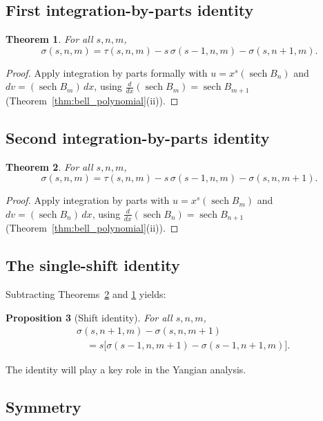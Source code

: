 \documentclass[article]{article}
\theoremstyle{plain}
\newtheorem{theorem}{Theorem}[section]
\newtheorem{proposition}[theorem]{Proposition}
\theoremstyle{definition}
\DeclareMathOperator{\sech}{sech}
\begin{document}
\subsection{First integration-by-parts identity}

\begin{theorem}\label{thm:ibp1}
For all $s,n,m$,
\[
\sigma(s,n,m)
=\tau(s,n,m)-s\,\sigma(s-1,n,m)-\sigma(s,n+1,m).
\]
\end{theorem}

\begin{proof}
Apply integration by parts formally with
$u=x^{s}(\sech B_{n})$ and $dv=(\sech B_{m})\,dx$,
using $\frac{d}{dx}(\sech B_{m})=\sech B_{m+1}$ (Theorem~\ref{thm:bell_polynomial}(ii)).
\end{proof}


\subsection{Second integration-by-parts identity}

\begin{theorem}\label{thm:ibp2}
For all $s,n,m$,
\[
\sigma(s,n,m)
=\tau(s,n,m)-s\,\sigma(s-1,n,m)-\sigma(s,n,m+1).
\]
\end{theorem}

\begin{proof}
Apply integration by parts with
$u=x^{s}(\sech B_{m})$ and $dv=(\sech B_{n})\,dx$,
using $\frac{d}{dx}(\sech B_{n})=\sech B_{n+1}$ (Theorem~\ref{thm:bell_polynomial}(ii)).
\end{proof}


\subsection{The single-shift identity}

Subtracting Theorems~\ref{thm:ibp2} and \ref{thm:ibp1} yields:

\begin{proposition}[Shift identity]\label{prop:shift}
For all $s,n,m$,
\begin{align*}
&\sigma(s,n+1,m)-\sigma(s,n,m+1)\\
&\quad = s\bigl[\sigma(s-1,n,m+1)-\sigma(s-1,n+1,m)\bigr].
\end{align*}
\end{proposition}

The identity will play a key role in the Yangian analysis.


\subsection{Symmetry}
\end{document}
